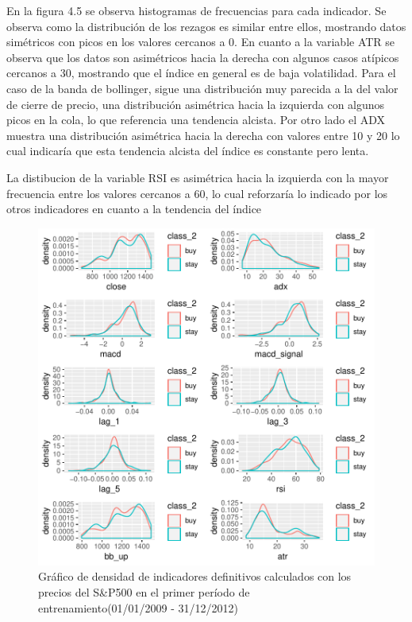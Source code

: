 \documentclass[a4paper,12pt]{Latex/Classes/PhDthesisPSnPDF}
\begin{document}
En la figura 4.5 se observa histogramas de frecuencias para cada indicador. Se observa como la distribución de los rezagos es similar entre ellos, mostrando datos simétricos con picos en los valores cercanos a 0. En cuanto a la variable ATR se observa que los datos son asimétricos hacia la derecha con algunos casos atípicos cercanos a 30, mostrando que el índice en general es de baja volatilidad. Para el caso de la banda de bollinger, sigue una distribución muy parecida a la del valor de cierre de precio, una distribución asimétrica hacia la izquierda con algunos picos en la cola, lo que referencia una tendencia alcista. Por otro lado el ADX muestra una distribución asimétrica hacia la derecha con valores entre 10 y 20 lo cual indicaría que esta tendencia alcista del índice es constante pero lenta. 

La distibucion de la variable RSI es asimétrica hacia la izquierda con la mayor frecuencia entre los valores cercanos a 60, lo cual reforzaría lo indicado por los otros indicadores en cuanto a la tendencia del índice 

\begin{figure}[H]
\centering
\includegraphics{main-011}
\caption{Gráfico de densidad de indicadores definitivos calculados con los precios del S\&P500 en el primer período de entrenamiento(01/01/2009 - 31/12/2012)}
\end{figure}
\end{document}

